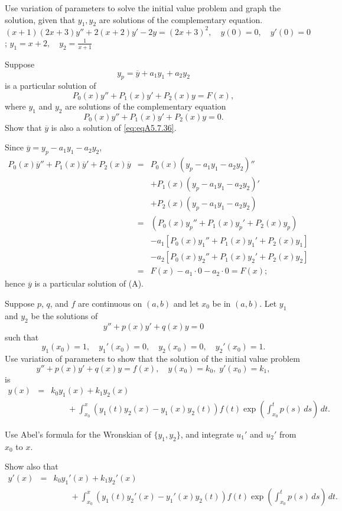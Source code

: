 \documentclass{ximera}
\begin{document}
\begin{problem}\label{exer:5.7.35} Use variation
of parameters to solve the initial value problem and graph the
solution, given that $y_1,y_2$ are solutions of the complementary
equation.
$(x+1)(2x+3)y''+2(x+2)y'-2y=(2x+3)^2, \quad  y(0)=0,\quad y'(0)=0$;
\newline $y_1=x+2,\quad y_2=\frac{1}{x+1}$
\end{problem}

\begin{problem}\label{exer:5.7.36}
Suppose
$$
y_p=\overline y+a_1y_1+a_2y_2
$$
is a particular solution of \begin{equation}\label{eq:eqA5.7.36}
P_0(x)y''+P_1(x)y'+P_2(x)y=F(x),
\end{equation}
where  $y_1$  and $y_2$ are  solutions of the complementary equation
$$
P_0(x)y''+P_1(x)y'+P_2(x)y=0.
$$
Show that $\overline y$  is also a solution of \ref{eq:eqA5.7.36}.

\begin{solution}
    Since $\overline y=y_p-a_1y_1-a_2y_2$,
\begin{eqnarray*}
P_0(x)\overline y''+P_1(x)\overline y'+P_2(x)\overline y&=&
P_0(x)(y_p-a_1y_1-a_2y_2)''\\ &&+P_1(x)(y_p-a_1y_1-a_2y_2)'\\ &&+
P_2(x)(y_p-a_1y_1-a_2y_2)\\ &=&
(P_0(x)y_p''+P_1(x)y_p'+P_2(x)y_p)\\ &&
-a_1\left[P_0(x)y_1''+P_1(x)y_1'+P_2(x)y_1\right]\\ &&
-a_2\left[P_0(x)y_2''+P_1(x)y_2'+P_2(x)y_2\right]\\
&=&F(x)-a_1\cdot0-a_2\cdot0=F(x);
\end{eqnarray*}
 hence $\overline y$
is a particular solution of (A).
\end{solution}
\end{problem}

\begin{problem}\label{exer:5.7.37}
Suppose $p$,  $q$, and $f$ are continuous
on $(a,b)$ and let $x_0$ be in $(a,b)$. Let
$y_1$ and $y_2$ be the  solutions of
$$
y''+p(x)y'+q(x)y=0
$$
such that
$$
y_1(x_0)=1, \quad y_1'(x_0)=0, \quad y_2(x_0)=0, \quad
y_2'(x_0)=1.
$$
Use variation of parameters to show that the solution of the initial
value problem
$$
y''+p(x)y'+q(x)y=f(x), \quad   y(x_0)=k_0,\;  y'(x_0)=k_1,
$$
is
$$
\begin{array}{rcl}
y(x) &=& k_0y_1(x)+k_1y_2(x) \\
& & \qquad+\int^x_{x_0}\left(y_1(t)y_2(x)-
y_1(x)y_2(t)\right)
f(t)\exp\left(\int^t_{x_0}p(s)\,ds\right)\,dt.
\end{array}
$$
\begin{hint}
Use Abel's formula for the Wronskian of $\{y_1,y_2\}$, and
integrate $u_1'$ and $u_2'$ from $x_0$ to $x$.
\end{hint}
Show also that
$$
\begin{array}{rcl}
y'(x) &=& k_0y_1'(x)+k_1y_2'(x) \\
& & \qquad+\int^x_{x_0}\left(y_1(t)y_2'(x)-y_1'(x)y_2(t)
\right)f(t)\exp\left(\int^t_{x_0}p(s)\,ds\right)\,dt.
\end{array}
$$
\end{problem}
\end{document}
